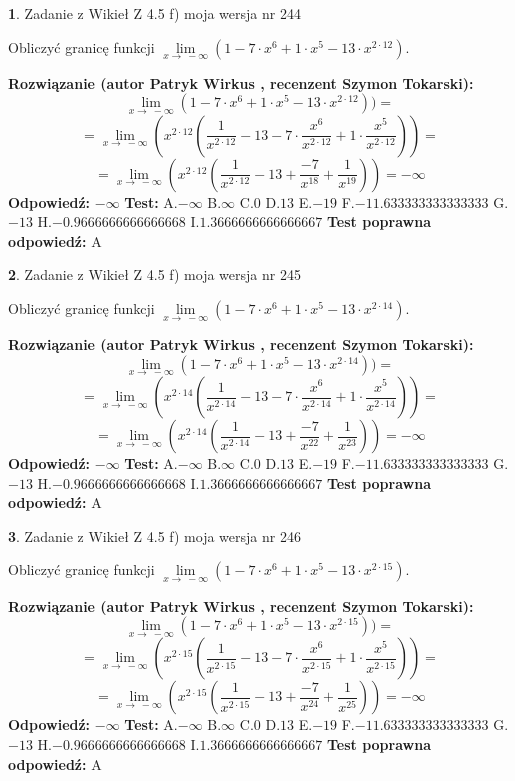 \documentclass[12pt, a4paper]{article}
\theoremstyle{definition} %
\newtheorem{zad}{}
\newcommand{\zadStart}[1]{\begin{zad}#1\newline}
\newcommand{\zadStop}{\end{zad}}
\newcommand{\rozwStart}[2]{\noindent \textbf{Rozwiązanie (autor #1 , recenzent #2): }\newline}
\newcommand{\rozwStop}{\newline}
\newcommand{\odpStart}{\noindent \textbf{Odpowiedź:}\newline}
\newcommand{\odpStop}{\newline}
\newcommand{\testStart}{\noindent \textbf{Test:}\newline}
\newcommand{\testStop}{\newline}
\newcommand{\kluczStart}{\noindent \textbf{Test poprawna odpowiedź:}\newline}
\newcommand{\kluczStop}{\newline}
\begin{document}
\zadStart{Zadanie z Wikieł Z 4.5 f) moja wersja nr 244}


Obliczyć granicę funkcji  $\lim\limits_{x\to\ -\infty}(1 - 7 \cdot x^{6}+1 \cdot x^{5}- 13 \cdot x^{2\cdot12})$.
\zadStop
\rozwStart{Patryk Wirkus}{Szymon Tokarski}
$$\lim\limits_{x\to\ -\infty}(1 - 7 \cdot x^{6}+1 \cdot x^{5}- 13 \cdot x^{2\cdot12}))=$$
$$=\lim\limits_{x\to\ -\infty}(x^{2\cdot12}(\frac{1}{x^{2\cdot12}}-13 -7 \cdot \frac{x^{6}}{x^{2\cdot12}}+1 \cdot \frac{x^{5}}{x^{2\cdot12}}))=$$
$$=\lim\limits_{x\to\ -\infty}(x^{2\cdot12}(\frac{1}{x^{2\cdot12}}-13 + \frac{-7}{x^{18}}+ \frac{1}{x^{19}}))=-\infty$$
\rozwStop
\odpStart
$-\infty$
\odpStop
\testStart
A.$-\infty$ B.$\infty$ C.$0$ D.$13$ E.$-19$
F.$-11.633333333333333$ G.$-13$
H.$-0.9666666666666668$
I.$1.3666666666666667$
\testStop
\kluczStart
A
\kluczStop



\zadStart{Zadanie z Wikieł Z 4.5 f) moja wersja nr 245}


Obliczyć granicę funkcji  $\lim\limits_{x\to\ -\infty}(1 - 7 \cdot x^{6}+1 \cdot x^{5}- 13 \cdot x^{2\cdot14})$.
\zadStop
\rozwStart{Patryk Wirkus}{Szymon Tokarski}
$$\lim\limits_{x\to\ -\infty}(1 - 7 \cdot x^{6}+1 \cdot x^{5}- 13 \cdot x^{2\cdot14}))=$$
$$=\lim\limits_{x\to\ -\infty}(x^{2\cdot14}(\frac{1}{x^{2\cdot14}}-13 -7 \cdot \frac{x^{6}}{x^{2\cdot14}}+1 \cdot \frac{x^{5}}{x^{2\cdot14}}))=$$
$$=\lim\limits_{x\to\ -\infty}(x^{2\cdot14}(\frac{1}{x^{2\cdot14}}-13 + \frac{-7}{x^{22}}+ \frac{1}{x^{23}}))=-\infty$$
\rozwStop
\odpStart
$-\infty$
\odpStop
\testStart
A.$-\infty$ B.$\infty$ C.$0$ D.$13$ E.$-19$
F.$-11.633333333333333$ G.$-13$
H.$-0.9666666666666668$
I.$1.3666666666666667$
\testStop
\kluczStart
A
\kluczStop



\zadStart{Zadanie z Wikieł Z 4.5 f) moja wersja nr 246}


Obliczyć granicę funkcji  $\lim\limits_{x\to\ -\infty}(1 - 7 \cdot x^{6}+1 \cdot x^{5}- 13 \cdot x^{2\cdot15})$.
\zadStop
\rozwStart{Patryk Wirkus}{Szymon Tokarski}
$$\lim\limits_{x\to\ -\infty}(1 - 7 \cdot x^{6}+1 \cdot x^{5}- 13 \cdot x^{2\cdot15}))=$$
$$=\lim\limits_{x\to\ -\infty}(x^{2\cdot15}(\frac{1}{x^{2\cdot15}}-13 -7 \cdot \frac{x^{6}}{x^{2\cdot15}}+1 \cdot \frac{x^{5}}{x^{2\cdot15}}))=$$
$$=\lim\limits_{x\to\ -\infty}(x^{2\cdot15}(\frac{1}{x^{2\cdot15}}-13 + \frac{-7}{x^{24}}+ \frac{1}{x^{25}}))=-\infty$$
\rozwStop
\odpStart
$-\infty$
\odpStop
\testStart
A.$-\infty$ B.$\infty$ C.$0$ D.$13$ E.$-19$
F.$-11.633333333333333$ G.$-13$
H.$-0.9666666666666668$
I.$1.3666666666666667$
\testStop
\kluczStart
A
\kluczStop
\end{document}
